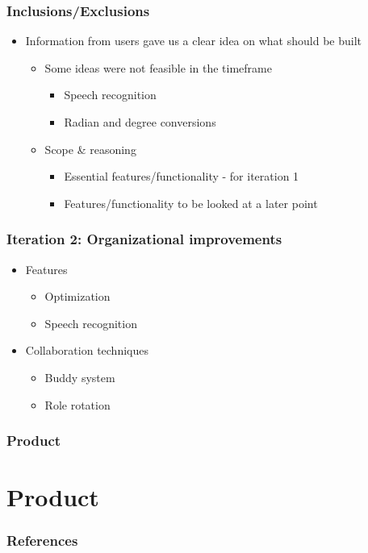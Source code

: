\documentclass{beamer}
\begin{document}
\begin{frame}
\frametitle{Inclusions/Exclusions}
\begin{itemize}
 \item Information from users gave us a clear idea on what should be built
  \begin{itemize}
  \item Some ideas were not feasible in the timeframe
  \begin{itemize}
    \item Speech recognition
    \item Radian and degree conversions
  \end{itemize}
  \item Scope \& reasoning
    \begin{itemize}
    \item Essential features/functionality - for iteration 1
    \item Features/functionality to be looked at a later point
  \end{itemize}
  \end{itemize}
  \end{itemize}
\end{frame}

\begin{frame}
\frametitle{Iteration 2: Organizational improvements}
\begin{itemize}
 \item Features
  \begin{itemize}
   \item Optimization
   \item Speech recognition
  \end{itemize}
 \item Collaboration techniques
  \begin{itemize}
   \item Buddy system
   \item Role rotation
  \end{itemize}
\end{itemize}
\end{frame}

\begin{frame}
\frametitle{Product}
\end{frame}

\section{Product}
\begin{frame}
\frametitle{References}
\end{frame}
\end{document}
